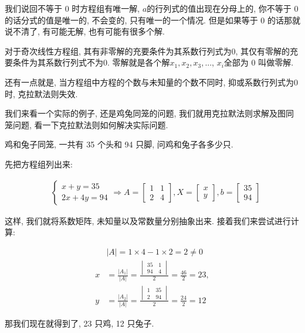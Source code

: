 我们说回不等于 0 时方程组有唯一解, $a$的行列式的值出现在分母上的, 你不等于 0 的话分式的值是唯一的, 不会变的, 只有唯一的一个情况. 但是如果等于 0 的话那就说不清了, 有可能无解, 也有可能有很多个解. 

对于奇次线性方程组, 其有非零解的充要条件为其系数行列式为$0$, 其仅有零解的充要条件为其系数行列式不为$0$. 零解就是各个解$x_1,x_2, x_3, ...$, $x_i$全部为 0 叫做零解. 

还有一点就是, 当方程组中方程的个数与未知量的个数不同时, 抑或系数行列式为$0$时, 克拉默法则失效. 

我们来看一个实际的例子, 还是鸡兔同笼的问题, 我们就用克拉默法则求解及图同笼问题, 看一下克拉默法则如何解决实际问题. 

鸡和兔子同笼, 一共有 35 个头和 94 只脚, 问鸡和兔子各多少只. 

先把方程组列出来: 

\begin{align*}
& \begin{cases}
x + y = 35 \\
2x + 4y = 94
\end{cases}
\Rightarrow
A = 
\begin{bmatrix}
1 & 1 \\
2 & 4
\end{bmatrix},
X = \begin{bmatrix}x \\ y \end{bmatrix}, 
b = \begin{bmatrix} 35 \\ 94 \end{bmatrix}
\end{align*}

这样, 我们就将系数矩阵, 未知量以及常数量分别抽象出来. 接着我们来尝试进行计算: 

\begin{align*}
  & |A| = 1 \times 4 - 1 \times 2 = 2 \ne 0 \\
  x &  = \frac{|A_1|}{|A|} = \frac{\begin{vmatrix} 35 \quad 1 \\ 94 \quad 4 \end{vmatrix}}{2} = \frac{46}{2} = 23, \\
  y & = \frac{|A_2|}{|A|} = \frac{\begin{vmatrix} 1 \quad 35 \\ 2 \quad 94 \end{vmatrix}}{2} = \frac{24}{2} = 12
\end{align*}

那我们现在就得到了, 23 只鸡, 12 只兔子. 

